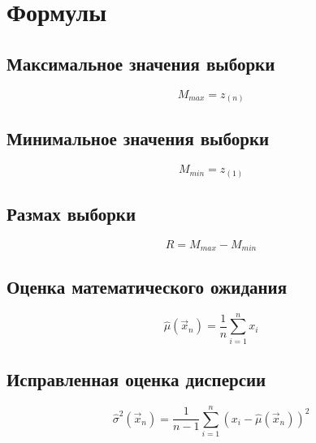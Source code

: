 \chapter{Формулы}

\section{Максимальное значения выборки}
\begin{equation}
M_{max} = z_{(n)}
\end{equation}

\section{Минимальное значения выборки}
\begin{equation}
M_{min} = z_{(1)}
\end{equation}

\section{Размах выборки}
\begin{equation}
R = M_{max} - M_{min}
\end{equation}

\section{Оценка математического ожидания }
\begin{equation}
\hat{\mu}(\vec{x}_n) = \frac{1}{n}\sum_{i=1}^n x_i
\end{equation}

\section{Исправленная оценка дисперсии}
\begin{equation}
\hat{\sigma}^2(\vec{x}_n) = \frac{1}{n - 1}\sum_{i=1}^n (x_i - \hat{\mu}(\vec{x}_n))^2
\end{equation}